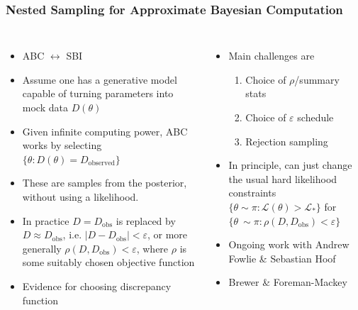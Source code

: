 \documentclass[aspectratio=169]{beamer}
\begin{document}
\begin{frame}
    \frametitle{Nested Sampling for Approximate Bayesian Computation}
    \begin{columns}
        \begin{itemize}
            \item ABC $\leftrightarrow$ SBI
            \item Assume one has a generative model capable of turning parameters into mock data $D(\theta)$
            \item Given infinite computing power, ABC works by selecting $\{\theta : D(\theta)=D_\mathrm{observed}\}$
            \item These are samples from the posterior, without using a likelihood.
            \item In practice $D=D_\mathrm{obs}$ is replaced by $D\approx D_\mathrm{obs}$, i.e. $|D-D_\mathrm{obs}|<\varepsilon$, or more generally $\rho(D,D_\mathrm{obs})<\varepsilon$, where $\rho$ is some suitably chosen objective function
            \item Evidence for choosing discrepancy function
        \end{itemize}
        \begin{itemize}
            \item Main challenges are 
                \begin{enumerate}
                    \item Choice of $\rho$/summary stats
                    \item Choice of $\varepsilon$ schedule
                    \item Rejection sampling
                \end{enumerate}
            \item In principle, can just change the usual hard likelihood constraints $\{\theta\sim\pi : \mathcal{L}(\theta)>\mathcal{L}_*\}$ for $\{\theta~\sim\pi : \rho(D,D_\mathrm{obs})<\varepsilon\}$
            \item Ongoing work with Andrew Fowlie \& Sebastian Hoof
            \item Brewer \& Foreman-Mackey~
        \end{itemize}
    \end{columns}
\end{frame}
\end{document}
